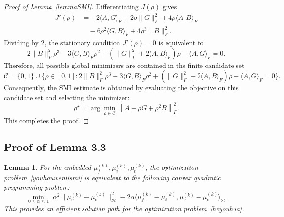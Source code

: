 \documentclass{article}
\theoremstyle{plain}
\newtheorem{lemma}[theorem]{Lemma}
\theoremstyle{definition}
\theoremstyle{remark}
\begin{document}
\begin{proof}[Proof of Lemma~\ref{lemmaSMI}]
Differentiating $J(\rho)$ gives
\begin{equation}
\begin{aligned}
J'(\rho)
&=
-2\langle A,G\rangle_F
+2\rho\|G\|_F^2
+4\rho\langle A,B\rangle_F \\
&\quad
-6\rho^2\langle G,B\rangle_F
+4\rho^3\|B\|_F^2 .
\end{aligned}
\end{equation}
Dividing by $2$, the stationary condition $J'(\rho)=0$ is equivalent to
\begin{equation}
2\|B\|_F^2\rho^3
-3\langle G,B\rangle_F\rho^2
+
\left(
\|G\|_F^2+2\langle A,B\rangle_F
\right)\rho
-
\langle A,G\rangle_F
=
0.
\end{equation}
Therefore, all possible global minimizers are contained in the finite candidate set
\begin{equation}
\mathcal C
=
\{0,1\}
\cup
\Big\{
\rho\in[0,1]:
2\|B\|_F^2\rho^3
-3\langle G,B\rangle_F\rho^2
+
\left(\|G\|_F^2+2\langle A,B\rangle_F\right)\rho
-\langle A,G\rangle_F
=0
\Big\}.
\end{equation}
Consequently, the SMI estimate is obtained by evaluating the objective on this candidate set and selecting the minimizer:
\begin{equation}
\rho^\star
=
\arg\min_{\rho\in\mathcal C}
\left\|
A-\rho G+\rho^2B
\right\|_F^2.
\end{equation}
This completes the proof.
\end{proof}

\subsection{Proof of Lemma 3.3}\label{A:3.3}
\begin{lemma}
    For the embedded $\mu^{(k)}_f, \mu^{(k)}_v, \mu^{(k)}_t$, the optimization problem~\eqref{youhauwentismi} is equivalent to the following convex quadratic programming problem:
    \begin{equation}
        \min_{0\le\alpha\le 1}\,\, \alpha^2\|\mu^{(k)}_v-\mu^{(k)}_t \|^2_\mathcal H-2\alpha\langle\mu_f^{(k)}-\mu_t^{(k)}, \mu_v^{(k)}-\mu_t^{(k)}\rangle_\mathcal H
    \end{equation}
    This provides an efficient solution path for the optimization problem~\eqref{heyouhua}.
\end{lemma}
\end{document}
